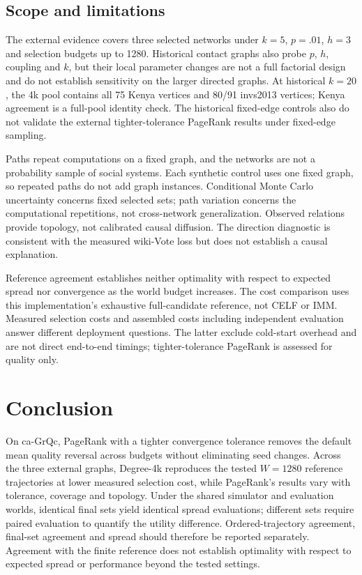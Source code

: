 \documentclass[smallextended]{svjour3}
\begin{document}
\subsection{Scope and limitations}
The external evidence covers three selected networks under $k=5$, $p=.01$, $h=3$ and selection budgets up to 1280. Historical contact graphs also probe $p$, $h$, coupling and $k$, but their local parameter changes are not a full factorial design and do not establish sensitivity on the larger directed graphs. At historical $k=20$, the 4k pool contains all 75 Kenya vertices and 80/91 invs2013 vertices; Kenya agreement is a full-pool identity check. The historical fixed-edge controls also do not validate the external tighter-tolerance PageRank results under fixed-edge sampling.

Paths repeat computations on a fixed graph, and the networks are not a probability sample of social systems. Each synthetic control uses one fixed graph, so repeated paths do not add graph instances. Conditional Monte Carlo uncertainty concerns fixed selected sets; path variation concerns the computational repetitions, not cross-network generalization. Observed relations provide topology, not calibrated causal diffusion. The direction diagnostic is consistent with the measured wiki-Vote loss but does not establish a causal explanation.

Reference agreement establishes neither optimality with respect to expected spread nor convergence as the world budget increases. The cost comparison uses this implementation's exhaustive full-candidate reference, not CELF or IMM. Measured selection costs and assembled costs including independent evaluation answer different deployment questions. The latter exclude cold-start overhead and are not direct end-to-end timings; tighter-tolerance PageRank is assessed for quality only.

\section{Conclusion}
On ca-GrQc, PageRank with a tighter convergence tolerance removes the default mean quality reversal across budgets without eliminating seed changes. Across the three external graphs, Degree-4k reproduces the tested $W=1280$ reference trajectories at lower measured selection cost, while PageRank's results vary with tolerance, coverage and topology. Under the shared simulator and evaluation worlds, identical final sets yield identical spread evaluations; different sets require paired evaluation to quantify the utility difference. Ordered-trajectory agreement, final-set agreement and spread should therefore be reported separately. Agreement with the finite reference does not establish optimality with respect to expected spread or performance beyond the tested settings.
\end{document}
